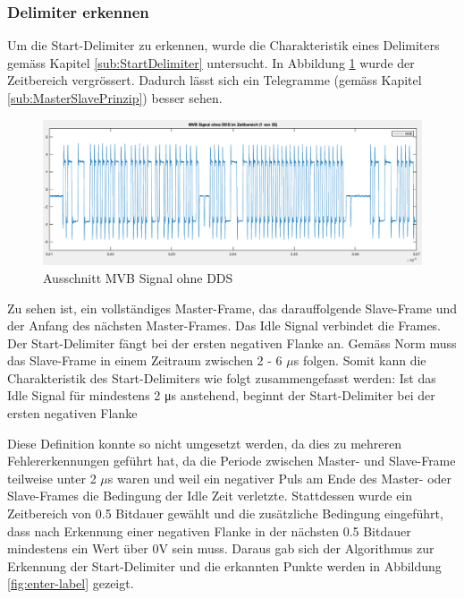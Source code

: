 \subsubsection{Delimiter erkennen}
Um die Start-Delimiter zu erkennen, wurde die Charakteristik eines Delimiters gemäss Kapitel \ref{sub:StartDelimiter} untersucht. In Abbildung \ref{fig:AusschnittMvbOhneDds} wurde der Zeitbereich vergrössert. Dadurch lässt sich ein Telegramme (gemäss Kapitel \ref{sub:MasterSlavePrinzip}) besser sehen.

\begin{figure}[H]
    \centering
    \includegraphics[width=0.8\linewidth]{Figures/Chap3/Busauslastung/Ausschnitt_MVB_ohne_Delimiter.png}
    \caption{Ausschnitt MVB Signal ohne DDS}
    \label{fig:AusschnittMvbOhneDds}
\end{figure}

Zu sehen ist, ein vollständiges Master-Frame, das darauffolgende Slave-Frame und der Anfang des nächsten Master-Frames. Das Idle Signal verbindet die Frames. Der Start-Delimiter fängt bei der ersten negativen Flanke an. Gemäss Norm muss das Slave-Frame in einem Zeitraum zwischen 2 - 6 $\mu$s folgen. Somit kann die Charakteristik des Start-Delimiters wie folgt zusammengefasst werden: Ist das Idle Signal für mindestens 2 μs anstehend, beginnt der Start-Delimiter bei der ersten negativen Flanke

Diese Definition konnte so nicht umgesetzt werden, da dies zu mehreren Fehlererkennungen geführt hat, da die Periode zwischen Master- und Slave-Frame teilweise unter 2 $\mu$s waren und weil ein negativer Puls am Ende des Master- oder Slave-Frames die Bedingung der Idle Zeit verletzte. Stattdessen wurde ein Zeitbereich von 0.5 Bitdauer gewählt und die zusätzliche Bedingung eingeführt, dass nach Erkennung einer negativen Flanke in der nächsten 0.5 Bitdauer mindestens ein Wert über 0V sein muss. Daraus gab sich der Algorithmus zur Erkennung der Start-Delimiter und die erkannten Punkte werden in Abbildung \ref{fig:enter-label} gezeigt.

